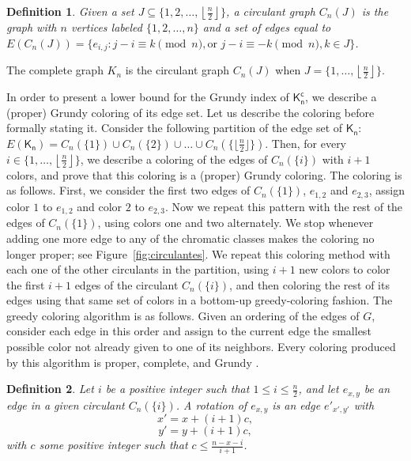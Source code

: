 \documentclass[11pt]{article}
\newtheorem{definition}{Definition}
\newcommand{\dol}[1]{\textcolor{blue}{#1}}
\begin{document}
\begin{definition}
Given a set $J \subseteq \{1,2,  \ldots, \left \lfloor\frac{n}{2} \right \rfloor\}$, a \emph{circulant graph}  $C_n(J)$ is the graph with $n$ vertices labeled $\{1, 2, \ldots, n\}$ and a set of edges equal to $E(C_n(J)) = \{e_{i,j} : j-i \equiv k \pmod n, \text{or } j - i \equiv -k \pmod n, k \in J\}$. 
\end{definition}

The complete graph $K_n$ is the circulant graph $C_n(J)$ when $J = \{1, \ldots, \left \lfloor\frac{n}{2} \right \rfloor\}$.

In order to present a lower bound for the Grundy index of $\mathsf{K^{c}_{n}}$, we describe a (proper) Grundy coloring of its edge set. Let us describe the coloring before formally stating it. Consider the following partition of the edge set of $\mathsf{K_n}$: $E(\mathsf{K_n}) = C_n(\{1\}) \cup C_n(\{2\}) \cup \ldots \cup  C_n(\{\lfloor\frac{n}{2} \rfloor\}).$ Then, for every $i \in \{1, \ldots, \left \lfloor\frac{n}{2} \right \rfloor\}$, we describe a coloring of the edges of $C_n(\{i\})$ with $i+1$ colors, and prove that this coloring is a (proper) Grundy coloring. The coloring is as follows. First, we consider the first two edges of $C_n(\{1\})$, $e_{1,2}$ and $e_{2,3}$, assign color $1$ to $e_{1,2}$ and color $2$ to $e_{2,3}$. Now we repeat this pattern with the rest of the edges of $C_n(\{1\})$, using colors one and two alternately. We stop whenever adding one more edge to any of the chromatic classes makes the coloring no longer proper; see Figure~\ref{fig:circulantes}. We repeat this coloring method with each one of the other circulants in the partition, using $i+1$ new colors to color the first $i+1$ edges of the circulant $C_n(\{i\})$, and then coloring the rest of its edges using that same set of colors in a bottom-up greedy-coloring fashion. The greedy coloring algorithm is as follows. Given an ordering of the edges of $G$, consider each edge in this order and assign to the current edge the smallest possible color not already given to one of its neighbors. Every coloring produced by this algorithm is proper, complete, and Grundy \cite{MR2450569}. 


\begin{definition}
Let $i$ be a positive integer such that $1 \leq i \leq \frac{n}{2}$, and let $e_{x,y}$ be an edge in a given circulant $C_n(\{i\})$. A \emph{rotation} of $e_{x,y}$ is an edge $e'_{x',y'}$ with $$x' = x + (i+1) c,$$ $$y' = y + (i+1) c,$$ with $c$ some positive integer such that $c \leq \frac{n-x-i}{i+1}$. 
\end{definition} %
\end{document}
